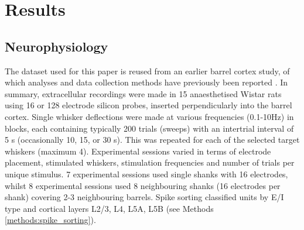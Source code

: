 \documentclass{article}
\begin{document}




















\section{Results}



\subsection*{Neurophysiology}

The dataset used for this paper is reused from an earlier barrel cortex study, of which analyses and data collection methods have previously been reported \cite{reyes2014laminar}. In summary, extracellular recordings were made in 15 anaesthetised Wistar rats using 16 or 128 electrode silicon probes, inserted perpendicularly into the barrel cortex. Single whisker deflections were made at various frequencies (0.1-10Hz) in blocks, each containing typically 200 trials (sweeps) with an intertrial interval of 5 s (occasionally 10, 15, or 30 s). This was repeated for each of the selected target whiskers (maximum 4). Experimental sessions varied in terms of electrode placement, stimulated whiskers, stimulation frequencies and number of trials per unique stimulus. 7 experimental sessions used single shanks with 16 electrodes, whilst 8 experimental sessions used 8 neighbouring shanks (16 electrodes per shank) covering 2-3 neighbouring barrels. Spike sorting classified units by E/I type and cortical layers L2/3, L4, L5A, L5B (see Methods \ref{methods:spike_sorting}).
\end{document}
